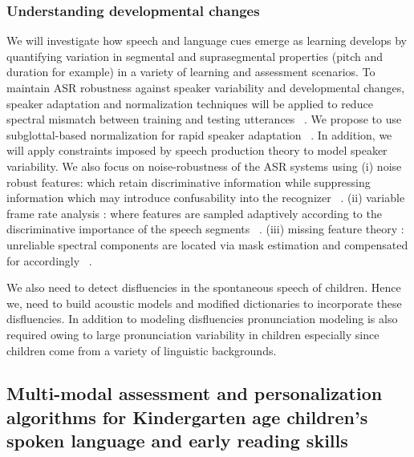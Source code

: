 \subsubsection{Understanding developmental changes} We will investigate how speech and language cues emerge as learning develops by quantifying variation in segmental and suprasegmental properties (pitch and duration for example) in a variety of learning and assessment scenarios. To maintain ASR robustness against speaker variability and developmental changes, speaker adaptation and normalization techniques will be applied to reduce spectral mismatch between training and testing utterances ~\cite{leggetter1995maximum}. We propose to use subglottal-based normalization for rapid speaker adaptation ~\cite{arsikere2012automatic}. In addition, we will apply constraints imposed by speech production theory to model speaker variability. We also focus on noise-robustness of the ASR systems using (i) noise robust features: which retain discriminative information while suppressing information which may introduce confusability into the recognizer ~\cite{strope1998robust}. (ii) variable frame rate analysis : where features are sampled adaptively according to the discriminative importance of the speech segments ~\cite{zhu2003non, you2004entropy}. (iii) missing feature theory : unreliable spectral components are located via mask estimation and compensated for accordingly ~\cite{borgstrom2009missing, tan2014feature}.
 
We also need to detect disfluencies in the spontaneous speech of children. Hence we, need to build acoustic models and modified dictionaries to incorporate these disfluencies. In addition to modeling disfluencies pronunciation modeling is also required owing to large pronunciation variability in children \cite{tepperman2006pronunciation} especially since children come from a variety of linguistic backgrounds.	



\subsection {Multi-modal assessment and personalization algorithms for Kindergarten age children's spoken language and early reading skills}
\label{section_assessment}

